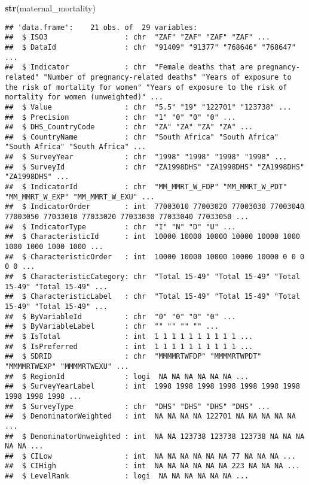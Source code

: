 \documentclass[
]{article}
\newenvironment{Shaded}{\begin{snugshade}}{\end{snugshade}}
\newcommand{\FunctionTok}[1]{\textcolor[rgb]{0.13,0.29,0.53}{\textbf{#1}}}
\newcommand{\NormalTok}[1]{#1}
\begin{document}
\begin{Shaded}
\begin{Highlighting}[]
\FunctionTok{str}\NormalTok{(maternal\_mortality)}
\end{Highlighting}
\end{Shaded}

\begin{verbatim}
## 'data.frame':    21 obs. of  29 variables:
##  $ ISO3                  : chr  "ZAF" "ZAF" "ZAF" "ZAF" ...
##  $ DataId                : chr  "91409" "91377" "768646" "768647" ...
##  $ Indicator             : chr  "Female deaths that are pregnancy-related" "Number of pregnancy-related deaths" "Years of exposure to the risk of mortality for women" "Years of exposure to the risk of mortality for women (unweighted)" ...
##  $ Value                 : chr  "5.5" "19" "122701" "123738" ...
##  $ Precision             : chr  "1" "0" "0" "0" ...
##  $ DHS_CountryCode       : chr  "ZA" "ZA" "ZA" "ZA" ...
##  $ CountryName           : chr  "South Africa" "South Africa" "South Africa" "South Africa" ...
##  $ SurveyYear            : chr  "1998" "1998" "1998" "1998" ...
##  $ SurveyId              : chr  "ZA1998DHS" "ZA1998DHS" "ZA1998DHS" "ZA1998DHS" ...
##  $ IndicatorId           : chr  "MM_MMRT_W_FDP" "MM_MMRT_W_PDT" "MM_MMRT_W_EXP" "MM_MMRT_W_EXU" ...
##  $ IndicatorOrder        : int  77003010 77003020 77003030 77003040 77003050 77033010 77033020 77033030 77033040 77033050 ...
##  $ IndicatorType         : chr  "I" "N" "D" "U" ...
##  $ CharacteristicId      : int  10000 10000 10000 10000 10000 1000 1000 1000 1000 1000 ...
##  $ CharacteristicOrder   : int  10000 10000 10000 10000 10000 0 0 0 0 0 ...
##  $ CharacteristicCategory: chr  "Total 15-49" "Total 15-49" "Total 15-49" "Total 15-49" ...
##  $ CharacteristicLabel   : chr  "Total 15-49" "Total 15-49" "Total 15-49" "Total 15-49" ...
##  $ ByVariableId          : chr  "0" "0" "0" "0" ...
##  $ ByVariableLabel       : chr  "" "" "" "" ...
##  $ IsTotal               : int  1 1 1 1 1 1 1 1 1 1 ...
##  $ IsPreferred           : int  1 1 1 1 1 1 1 1 1 1 ...
##  $ SDRID                 : chr  "MMMMRTWFDP" "MMMMRTWPDT" "MMMMRTWEXP" "MMMMRTWEXU" ...
##  $ RegionId              : logi  NA NA NA NA NA NA ...
##  $ SurveyYearLabel       : int  1998 1998 1998 1998 1998 1998 1998 1998 1998 1998 ...
##  $ SurveyType            : chr  "DHS" "DHS" "DHS" "DHS" ...
##  $ DenominatorWeighted   : int  NA NA NA NA 122701 NA NA NA NA NA ...
##  $ DenominatorUnweighted : int  NA NA 123738 123738 123738 NA NA NA NA NA ...
##  $ CILow                 : int  NA NA NA NA NA NA 77 NA NA NA ...
##  $ CIHigh                : int  NA NA NA NA NA NA 223 NA NA NA ...
##  $ LevelRank             : logi  NA NA NA NA NA NA ...
\end{verbatim}
\end{document}
